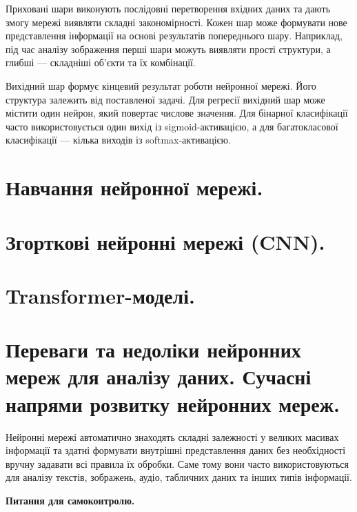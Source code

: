 Приховані шари виконують послідовні перетворення вхідних даних та дають змогу мережі виявляти складні закономірності. Кожен шар може формувати нове представлення інформації на основі результатів попереднього шару. Наприклад, під час аналізу зображення перші шари можуть виявляти прості структури, а глибші — складніші об'єкти та їх комбінації.

Вихідний шар формує кінцевий результат роботи нейронної мережі. Його структура залежить від поставленої задачі. Для регресії вихідний шар може містити один нейрон, який повертає числове значення. Для бінарної класифікації часто використовується один вихід із sigmoid-активацією, а для багатокласової класифікації — кілька виходів із softmax-активацією.

\section{Навчання нейронної мережі.}


\section{Згорткові нейронні мережі (CNN).}


\section{Transformer-моделі.}




\section{Переваги та недоліки нейронних мереж для аналізу даних. Сучасні напрями розвитку нейронних мереж.}

Нейронні мережі автоматично знаходять складні залежності у великих масивах інформації та здатні формувати внутрішні представлення даних без необхідності вручну задавати всі правила їх обробки. Саме тому вони часто використовуються для аналізу текстів, зображень, аудіо, табличних даних та інших типів інформації.






 \textbf{Питання для самоконтролю.}

